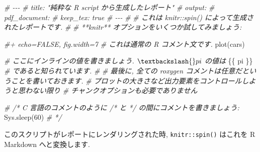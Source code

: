 \documentclass[
  11pt,
  lualatex,ja=standard,jafont=noto]{bxjsreport}
\newenvironment{Shaded}{\begin{snugshade}}{\end{snugshade}}
\newcommand{\CommentTok}[1]{\textcolor[rgb]{0.56,0.35,0.01}{\textit{#1}}}
\newcommand{\DecValTok}[1]{\textcolor[rgb]{0.00,0.00,0.81}{#1}}
\newcommand{\FunctionTok}[1]{\textcolor[rgb]{0.00,0.00,0.00}{#1}}
\newcommand{\NormalTok}[1]{#1}
\begin{document}
\begin{Shaded}
\begin{Highlighting}[]
\CommentTok{\#\textquotesingle{} {-}{-}{-}}
\CommentTok{\#\textquotesingle{} title: "純粋な R script から生成したレポート"}
\CommentTok{\#\textquotesingle{} output:}
\CommentTok{\#\textquotesingle{}   pdf\_document:}
\CommentTok{\#\textquotesingle{}     keep\_tex: true}
\CommentTok{\#\textquotesingle{} {-}{-}{-}}
\CommentTok{\#\textquotesingle{}}
\CommentTok{\#\textquotesingle{} これは \textasciigrave{}knitr::spin()\textasciigrave{} によって生成されたレポートです.}
\CommentTok{\#\textquotesingle{}}
\CommentTok{\#\textquotesingle{} **knitr** オプションをいくつか試してみましょう:}

\CommentTok{\#+ echo=FALSE, fig.width=7}
\CommentTok{\#  これは通常の R コメント文です.}
\FunctionTok{plot}\NormalTok{(cars)}

\CommentTok{\#\textquotesingle{} ここにインラインの値を書きましょう. $\textbackslash{}pi$ の値は}
\NormalTok{\{\{ pi \}\}}
\CommentTok{\#\textquotesingle{} であると知られています.}
\CommentTok{\#\textquotesingle{}}
\CommentTok{\#\textquotesingle{} 最後に, 全ての roxygen コメントは任意だということを書いておきます.}
\CommentTok{\#\textquotesingle{} プロットの大きさなど出力要素をコントロールしようと思わない限り}
\CommentTok{\#\textquotesingle{} チャンクオプションも必要でありません}

\CommentTok{\# /* C 言語のコメントのように /* と */ の間にコメントを書きましょう:}
\FunctionTok{Sys.sleep}\NormalTok{(}\DecValTok{60}\NormalTok{)}
\CommentTok{\# */}
\end{Highlighting}
\end{Shaded}

このスクリプトがレポートにレンダリングされた時, \texttt{knitr::spin()} はこれを R Markdown へと変換します.
\end{document}
